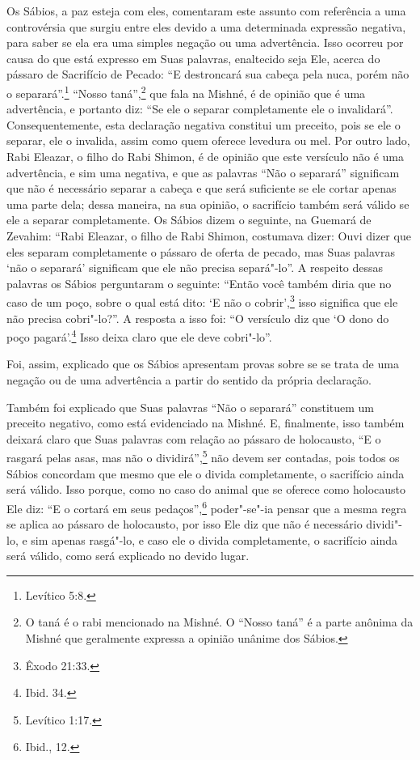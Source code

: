 Os Sábios, a paz esteja com eles, comentaram este assunto com
referência a uma controvérsia que surgiu entre eles devido a uma
determinada expressão negativa, para saber se ela era uma simples
negação ou uma advertência. Isso ocorreu por causa do que está expresso
em Suas palavras, enaltecido seja Ele, acerca do pássaro de Sacrifício
de Pecado: ``E destroncará sua cabeça pela nuca, porém não o separará''.\footnote{Levítico 5:8.} ``Nosso taná\starr'',\footnote{O taná\starr{} é o rabi mencionado na Mishné. O ``Nosso taná\starr{}'' é a
parte anônima da Mishné que geralmente expressa a opinião unânime dos
Sábios.} que fala na Mishné,
é de opinião que é uma advertência, e portanto diz: ``Se ele o separar
completamente ele o invalidará''. Consequentemente, esta declaração
negativa constitui um preceito, pois se ele o separar, ele o invalida,
assim como quem oferece levedura ou mel. Por outro lado, Rabi Eleazar\starr, o
filho do Rabi Shimon, é de opinião que este versículo não é uma
advertência, e sim uma negativa, e que as palavras ``Não o separará''
significam que não é necessário separar a cabeça e que será suficiente
se ele cortar apenas uma parte dela; dessa maneira, na sua opinião, o
sacrifício também será válido se ele a separar completamente. Os Sábios
dizem o seguinte, na Guemará\starr{} de Zevahim\starr: ``Rabi Eleazar\starr, o filho de Rabi
Shimon, costumava dizer: Ouvi dizer que eles separam completamente o
pássaro de oferta de pecado, mas Suas palavras `não o separará'
significam que ele não precisa separá"-lo''. A respeito dessas palavras
os Sábios perguntaram o seguinte: ``Então você também diria que no caso
de um poço, sobre o qual está
dito: `E não o cobrir',\footnote{Êxodo 21:33.} isso significa que ele não precisa
cobri"-lo?''. A resposta a isso foi: ``O versículo diz que `O dono do
poço pagará'.\footnote{Ibid. 34.} Isso deixa claro que ele deve cobri"-lo''.

Foi, assim, explicado que os Sábios apresentam provas sobre se se trata
de uma negação ou de uma advertência a partir do sentido da própria
declaração.

Também foi explicado que Suas palavras ``Não o separará'' constituem um
preceito negativo, como está evidenciado na Mishné. E, finalmente, isso
também deixará claro que Suas palavras com relação ao pássaro de
holocausto, ``E o rasgará pelas asas, mas não o dividirá'',\footnote{Levítico
1:17.} não devem ser contadas, pois todos os Sábios concordam que mesmo
que ele o divida completamente, o sacrifício ainda será válido. Isso
porque, como no caso do animal que se oferece como holocausto Ele diz:
``E o cortará em seus pedaços'',\footnote{Ibid., 12.} poder"-se"-ia pensar que a
mesma regra se aplica ao pássaro de holocausto, por isso Ele diz que
não é necessário dividi"-lo, e sim apenas rasgá"-lo, e caso ele o divida
completamente, o sacrifício ainda será válido, como será explicado no
devido lugar.

